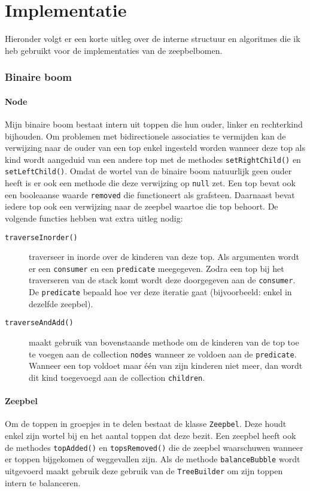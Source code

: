 \documentclass[12pt,hidelinks]{article}
\begin{document}
    \part{Implementatie}
    Hieronder volgt er een korte uitleg over de interne structuur en algoritmes die
    ik heb gebruikt voor de implementaties van de zeepbelbomen.
    \section{Binaire boom}
    \subsection{Node}
    Mijn binaire boom bestaat intern uit toppen die hun ouder,  linker en
    rechterkind bijhouden. Om problemen met bidirectionele associaties te vermijden kan de verwijzing
    naar de ouder van een top enkel ingesteld worden wanneer deze top als kind wordt
    aangeduid van een andere top met de methodes {\tt setRightChild()} en {\tt setLeftChild()}. Omdat de wortel van de binaire boom natuurlijk geen
    ouder heeft is er ook een methode die deze verwijzing op {\tt null} zet.
    Een top bevat ook een booleaanse waarde {\tt removed} die functioneert als
    grafsteen. Daarnaast bevat iedere top ook een verwijzing naar de zeepbel waartoe die 
    top behoort. De volgende functies hebben wat extra uitleg nodig:\\
        \begin{description}
            \item[\tt traverseInorder()] traverseer in inorde over de kinderen van deze top. Als argumenten wordt er een {\tt consumer} en een {\tt predicate} meegegeven.
                Zodra een top bij het traverseren van de stack komt wordt deze doorgegeven aan de {\tt consumer}. De {\tt predicate} bepaald hoe ver deze iteratie gaat
                (bijvoorbeeld: enkel in dezelfde zeepbel).
            \item[\tt traverseAndAdd()] maakt gebruik van bovenstaande methode om de kinderen van de top toe te voegen aan de collection {\tt nodes} wanneer ze voldoen aan de
                {\tt predicate}. Wanneer een top voldoet maar één van zijn kinderen niet meer, dan wordt dit kind toegevoegd aan de collection {\tt children}.
        \end{description}
    \subsection{Zeepbel}
    Om de toppen in groepjes in te delen bestaat de klasse {\tt Zeepbel}. Deze houdt
    enkel zijn wortel bij en het aantal toppen dat deze bezit. Een zeepbel heeft ook de
    methodes {\tt topAdded()} en {\tt topsRemoved()} die de zeepbel waarschuwen wanneer
    er toppen bijgekomen of weggevallen zijn. Als de methode {\tt balanceBubble} wordt uitgevoerd
    maakt gebruik deze gebruik van de {\tt TreeBuilder} om zijn toppen intern te balanceren.
\end{document}
